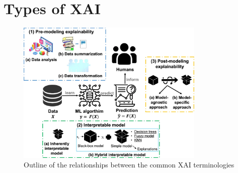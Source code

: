 \section{Types of XAI}
\begin{minipage}[c]{0.5\textwidth}
    \begin{figure}[H]
        \includegraphics[width=0.8\textwidth]{img/types_XAI.png}
        \centering
        \caption{Outline of the relationships between the common XAI terminologies}
    \end{figure}
\end{minipage}
